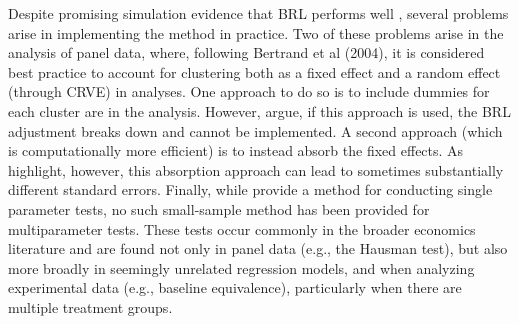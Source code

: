 \documentclass[12pt]{article}\usepackage[]{graphicx}\usepackage[]{color}
\begin{document}
Despite promising simulation evidence that BRL performs well \citep[e.g.,][]{Imbens2012robust}, several problems arise in implementing the method in practice. 
Two of these problems arise in the analysis of panel data, where, following Bertrand et al (2004), it is considered best practice to account for clustering both as a fixed effect and a random effect (through CRVE) in analyses. 
One approach to do so is to include dummies for each cluster are in the analysis. However, \citet{Angrist2009mostly} argue, if this approach is used, the BRL adjustment breaks down and cannot be implemented.
A second approach (which is computationally more efficient) is to instead absorb the fixed effects. As \citet{Cameron2015practitioners} highlight, however, this absorption approach can lead to sometimes substantially different standard errors. 
Finally, while \citet{Bell2002bias} provide a method for conducting single parameter tests, no such small-sample method has been provided for multiparameter tests.
These tests occur commonly in the broader economics literature and are found not only in panel data (e.g., the Hausman test), but also more broadly in seemingly unrelated regression models, and when analyzing experimental data (e.g., baseline equivalence), particularly when there are multiple treatment groups. 
\end{document}
